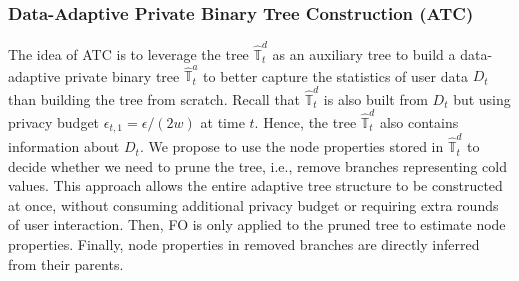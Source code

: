 \documentclass[acmsmall]{acmart}
\newcommand{\Tree}{\mathbb{T}}
\newcommand{\hDT}{\hat{\Tree}^d}
\newcommand{\hAT}{\hat{\Tree}^a}
\begin{document}
\subsubsection{Data-Adaptive Private Binary Tree Construction (ATC)}

The idea of ATC is to leverage the tree $\hDT_t$ as an auxiliary tree to build a
data-adaptive private binary tree $\hAT_t$ to better capture the statistics of
user data $D_t$ than building the tree from scratch.
Recall that $\hDT_t$ is also built from $D_t$ but using privacy budget
$\epsilon_{t,1} = \epsilon/(2w)$ at time $t$.
Hence, the tree $\hDT_t$ also contains information about $D_t$.
We propose to use the node properties stored in $\hDT_t$ to decide whether we
need to prune the tree, i.e., remove branches representing cold values.
This approach allows the entire adaptive tree structure to be constructed at once, without consuming additional privacy budget or requiring extra rounds of user interaction.
Then, FO is only applied to the pruned tree to estimate node properties.
Finally, node properties in removed branches are directly inferred from their
parents.
\end{document}
